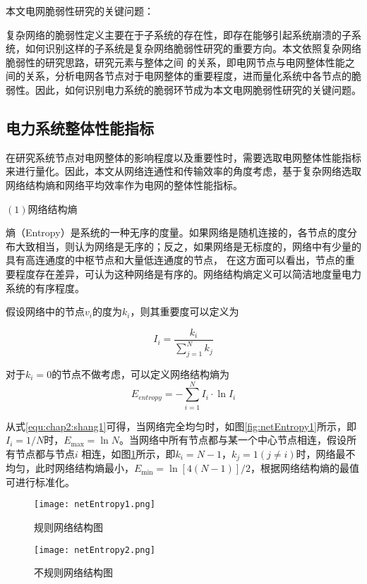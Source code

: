 本文电网脆弱性研究的关键问题：

复杂网络的脆弱性定义主要在于子系统的存在性，即存在能够引起系统崩溃的子系统，如何识别这样的子系统是复杂网络脆弱性研究的重要方向。本文依照复杂网络脆弱性的研究思路，研究元素与整体之间
的关系，即电网节点与电网整体性能之间的关系，分析电网各节点对于电网整体的重要程度，进而量化系统中各节点的脆弱性。因此，如何识别电力系统的脆弱环节成为本文电网脆弱性研究的关键问题。



\subsection{电力系统整体性能指标}
\label{sec:loadModel}
在研究系统节点对电网整体的影响程度以及重要性时，需要选取电网整体性能指标来进行量化。因此，本文从网络连通性和传输效率的角度考虑，基于复杂网络选取网络结构熵和网络平均效率作为电网的整体性能指标。

$(1)$网络结构熵

熵（Entropy）是系统的一种无序的度量。如果网络是随机连接的，各节点的度分布大致相当，则认为网络是无序的；反之，如果网络是无标度的，网络中有少量的具有高连通度的中枢节点和大量低连通度的节点，
在这方面可以看出，节点的重要程度存在差异，可认为这种网络是有序的。网络结构熵定义可以简洁地度量电力系统的有序程度。

\begin{definition}
  假设网络中的节点$v_i$的度为$k_i$，则其重要度可以定义为\cite{refsNetShang}
\end{definition}
\begin{equation}
  I_{i}=\frac{k_{i}}{\sum_{j=1}^{N} k_{j}}
\end{equation}

对于$k_i = 0$的节点不做考虑，可以定义网络结构熵为
\begin{equation}
\label{equ:chap2:shang1}
  E_{entropy}=-\sum_{i=1}^{N} I_{i} \cdot \ln I_{i}
\end{equation}

从式\ref{equ:chap2:shang1}可得，当网络完全均匀时，如图\ref{fig:netEntropy1}所示，即$I_{i}=1 / N$时，$E_{\max }=\ln N$。当网络中所有节点都与某一个中心节点相连，假设所有节点都与节点$i$
相连，如图\ref{fig:netEntropy2}所示，即$k_i = N-1$，$k_j = 1(j \neq i)$时，网络最不均匀，此时网络结构熵最小，$E_{\min }=\ln [4(N-1)] / 2$，根据网络结构熵的最值可进行标准化。
\begin{figure}[H] %
  \begin{minipage}[t]{0.5\linewidth}
  \centering
  \texttt{[image: netEntropy1.png]}
  \caption{规则网络结构图}
  \label{fig:netEntropy1}
  \end{minipage}
  \begin{minipage}[t]{0.5\linewidth}
  \centering
  \texttt{[image: netEntropy2.png]}
  \caption{不规则网络结构图}
  \label{fig:netEntropy2}
  \end{minipage}
\end{figure}


